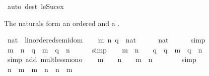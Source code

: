 \begin{isabellebody}
\ {\isacharparenleft}{\kern0pt}auto\ dest{\isacharcolon}{\kern0pt}\ le{\isacharunderscore}{\kern0pt}Suc{\isacharunderscore}{\kern0pt}ex{\isacharparenright}{\kern0pt}%
\endisatagproof
{\isafoldproof}%
%
\isadelimproof
%
\endisadelimproof
%
\begin{isamarkuptext}%
The naturals form an ordered  and a .%
\end{isamarkuptext}\isamarkuptrue%
\isamarkupfalse%
\ nat\ {\isacharcolon}{\kern0pt}{\isacharcolon}{\kern0pt}\ linordered{\isacharunderscore}{\kern0pt}semidom\isanewline
%
\isadelimproof
%
\endisadelimproof
%
\isatagproof
{}\isamarkupfalse%
\isanewline
\ \ \isamarkupfalse%
\ m\ n\ q\ {\isacharcolon}{\kern0pt}{\isacharcolon}{\kern0pt}\ nat\isanewline
\ \ \isamarkupfalse%
\ {\isachardoublequoteopen}{}\ {\isacharless}{\kern0pt}\ {\isacharparenleft}{\kern0pt}{}{\isacharcolon}{\kern0pt}{\isacharcolon}{\kern0pt}nat{\isacharparenright}{\kern0pt}{\isachardoublequoteclose}\isanewline
\ \ \ \ \isamarkupfalse%
\ simp\isanewline
\ \ \isamarkupfalse%
\ {\isachardoublequoteopen}m\ {\isasymle}\ n\ {\isasymLongrightarrow}\ q\ {\isacharplus}{\kern0pt}\ m\ {\isasymle}\ q\ {\isacharplus}{\kern0pt}\ n{\isachardoublequoteclose}\isanewline
\ \ \ \ \isamarkupfalse%
\ simp\isanewline
\ \ \isamarkupfalse%
\ {\isachardoublequoteopen}m\ {\isacharless}{\kern0pt}\ n\ {\isasymLongrightarrow}\ {}\ {\isacharless}{\kern0pt}\ q\ {\isasymLongrightarrow}\ q\ {\isacharasterisk}{\kern0pt}\ m\ {\isacharless}{\kern0pt}\ q\ {\isacharasterisk}{\kern0pt}\ n{\isachardoublequoteclose}\isanewline
\ \ \ \ \isamarkupfalse%
\ {\isacharparenleft}{\kern0pt}simp\ add{\isacharcolon}{\kern0pt}\ mult{\isacharunderscore}{\kern0pt}less{\isacharunderscore}{\kern0pt}mono{}{\isacharparenright}{\kern0pt}\isanewline
\ \ \isamarkupfalse%
\ {\isachardoublequoteopen}m\ {\isasymnoteq}\ {}\ {\isasymLongrightarrow}\ n\ {\isasymnoteq}\ {}\ {\isasymLongrightarrow}\ m\ {\isacharasterisk}{\kern0pt}\ n\ {\isasymnoteq}\ {}{\isachardoublequoteclose}\isanewline
\ \ \ \ \isamarkupfalse%
\ simp\isanewline
\ \ \isamarkupfalse%
\ {\isachardoublequoteopen}n\ {\isasymle}\ m\ {\isasymLongrightarrow}\ {\isacharparenleft}{\kern0pt}m\ {\isacharminus}{\kern0pt}\ n{\isacharparenright}{\kern0pt}\ {\isacharplus}{\kern0pt}\ n\ {\isacharequal}{\kern0pt}\ m{\isachardoublequoteclose}\isanewline

\end{isabellebody}
